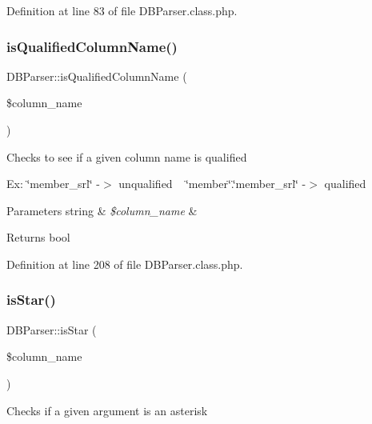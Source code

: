 Definition at line 83 of file D\+B\+Parser.\+class.\+php.

\mbox{\label{classDBParser_a927c668f7d1b2994743f9bdf6530ba58}} 
\subsubsection{\texorpdfstring{is\+Qualified\+Column\+Name()}{isQualifiedColumnName()}}
{\footnotesize\ttfamily D\+B\+Parser\+::is\+Qualified\+Column\+Name (\begin{DoxyParamCaption}\item[{}]{\$column\+\_\+name }\end{DoxyParamCaption})}

Checks to see if a given column name is qualified

Ex\+: \char`\"{}member\+\_\+srl\char`\"{} -\/$>$ unqualified ~\newline
 \char`\"{}member\char`\"{}.\char`\"{}member\+\_\+srl\char`\"{} -\/$>$ qualified


\begin{DoxyParams}[1]{Parameters}
string & {\em \$column\+\_\+name} & \\
\hline
\end{DoxyParams}
\begin{DoxyReturn}{Returns}
bool 
\end{DoxyReturn}


Definition at line 208 of file D\+B\+Parser.\+class.\+php.

\mbox{\label{classDBParser_a73f99ee88bbe7c6bc871a67de4efa2b1}} 
\subsubsection{\texorpdfstring{is\+Star()}{isStar()}}
{\footnotesize\ttfamily D\+B\+Parser\+::is\+Star (\begin{DoxyParamCaption}\item[{}]{\$column\+\_\+name }\end{DoxyParamCaption})}

Checks if a given argument is an asterisk


